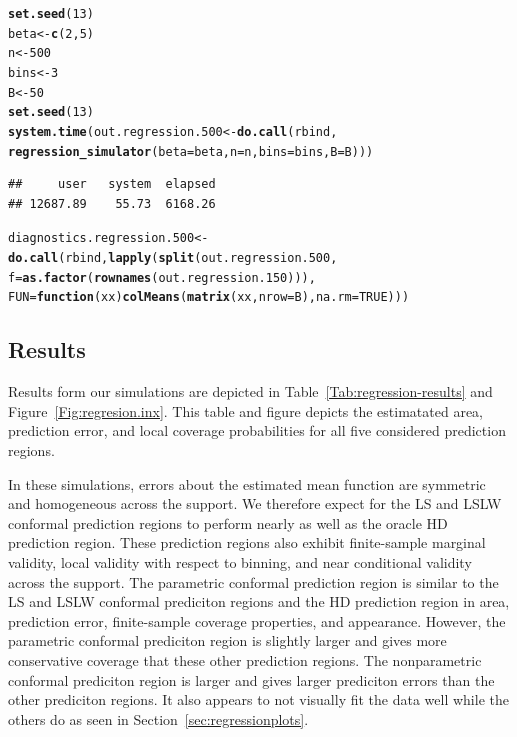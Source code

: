 \documentclass[11pt]{article}\usepackage[]{graphicx}\usepackage[]{color}
\makeatletter
\newcommand{\hlnum}[1]{\textcolor[rgb]{0.686,0.059,0.569}{#1}}%
\newcommand{\hlstd}[1]{\textcolor[rgb]{0.345,0.345,0.345}{#1}}%
\newcommand{\hlkwa}[1]{\textcolor[rgb]{0.161,0.373,0.58}{\textbf{#1}}}%
\newcommand{\hlkwb}[1]{\textcolor[rgb]{0.69,0.353,0.396}{#1}}%
\newcommand{\hlkwc}[1]{\textcolor[rgb]{0.333,0.667,0.333}{#1}}%
\newcommand{\hlkwd}[1]{\textcolor[rgb]{0.737,0.353,0.396}{\textbf{#1}}}%
\newenvironment{kframe}{%
 \def\at@end@of@kframe{}%
 \ifinner\ifhmode%
  \def\at@end@of@kframe{\end{minipage}}%
  \begin{minipage}{\columnwidth}%
 \fi\fi%
 \def\FrameCommand##1{\hskip\@totalleftmargin \hskip-\fboxsep
 \colorbox{shadecolor}{##1}\hskip-\fboxsep
     \hskip-\linewidth \hskip-\@totalleftmargin \hskip\columnwidth}%
 \MakeFramed {\advance\hsize-\width
   \@totalleftmargin\z@ \linewidth\hsize
   \@setminipage}}%
 {\par\unskip\endMakeFramed%
 \at@end@of@kframe}
\newenvironment{knitrout}{}{} %
\makeatother
\begin{document}
\begin{knitrout}
\color{fgcolor}\begin{kframe}
\begin{alltt}
\hlkwd{set.seed}\hlstd{(}\hlnum{13}\hlstd{)}
\hlstd{beta} \hlkwb{<-} \hlkwd{c}\hlstd{(}\hlnum{2}\hlstd{,} \hlnum{5}\hlstd{)}
\hlstd{n} \hlkwb{<-} \hlnum{500}
\hlstd{bins} \hlkwb{<-} \hlnum{3}
\hlstd{B} \hlkwb{<-} \hlnum{50}
\hlkwd{set.seed}\hlstd{(}\hlnum{13}\hlstd{)}
\hlkwd{system.time}\hlstd{(out.regression.500} \hlkwb{<-} \hlkwd{do.call}\hlstd{(rbind,}
  \hlkwd{regression_simulator}\hlstd{(}\hlkwc{beta} \hlstd{= beta,} \hlkwc{n} \hlstd{= n,} \hlkwc{bins} \hlstd{= bins,} \hlkwc{B} \hlstd{= B)))}
\end{alltt}
\begin{verbatim}
##     user   system  elapsed 
## 12687.89    55.73  6168.26
\end{verbatim}
\begin{alltt}
\hlstd{diagnostics.regression.500} \hlkwb{<-} \hlkwd{do.call}\hlstd{(rbind,} \hlkwd{lapply}\hlstd{(}\hlkwd{split}\hlstd{(out.regression.500,}
  \hlkwc{f} \hlstd{=} \hlkwd{as.factor}\hlstd{(}\hlkwd{rownames}\hlstd{(out.regression.150))),}
  \hlkwc{FUN} \hlstd{=} \hlkwa{function}\hlstd{(}\hlkwc{xx}\hlstd{)} \hlkwd{colMeans}\hlstd{(}\hlkwd{matrix}\hlstd{(xx,} \hlkwc{nrow} \hlstd{= B),} \hlkwc{na.rm} \hlstd{=} \hlnum{TRUE}\hlstd{)))}
\end{alltt}
\end{kframe}
\end{knitrout}


\subsection{Results}

Results form our simulations are depicted in 
Table~\ref{Tab:regression-results} and Figure~\ref{Fig:regresion.inx}.  
This table and figure depicts the estimatated area, prediction 
error, and local coverage probabilities for all five considered prediction 
regions. 

In these simulations, errors about the estimated mean function are symmetric 
and homogeneous across the support.  We therefore expect for the LS and LSLW 
conformal prediction regions to perform nearly as well as the oracle HD 
prediction region.  These prediction regions also exhibit finite-sample 
marginal validity, local validity with respect to binning, and near 
conditional validity across the support.  The parametric conformal prediction 
region is similar to the LS and LSLW conformal prediciton regions and the HD 
prediction region in area, prediction error, finite-sample coverage 
properties, and appearance.  However, the parametric conformal prediciton 
region is slightly larger and gives more conservative coverage that these 
other prediction regions.  The nonparametric conformal prediciton region 
is larger and gives larger prediciton errors than the other prediciton 
regions.  It also appears to not visually fit the data well while the others 
do as seen in Section~\ref{sec:regressionplots}.
\end{document}

